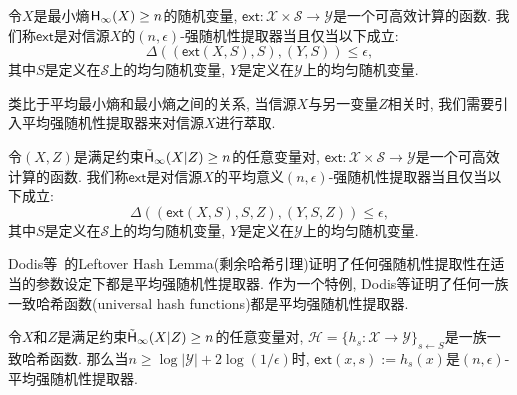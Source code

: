 \begin{definition}[强随机性提取器]
令$X$是最小熵$\mathsf{H}_\infty(X) \geq n$的随机变量,  
$\mathsf{ext}: \mathcal{X} \times \mathcal{S} \rightarrow \mathcal{Y}$是一个可高效计算的函数. 
我们称$\mathsf{ext}$是对信源$X$的$(n, \epsilon)$-强随机性提取器当且仅当以下成立:
\begin{equation*}
    \Delta((\mathsf{ext}(X, S), S), (Y, S)) \leq \epsilon,
\end{equation*} 
其中$S$是定义在$\mathcal{S}$上的均匀随机变量, $Y$是定义在$\mathcal{Y}$上的均匀随机变量. 
\end{definition}

类比于平均最小熵和最小熵之间的关系, 当信源$X$与另一变量$Z$相关时, 我们需要引入平均强随机性提取器来对信源$X$进行萃取.  
\begin{definition}[平均强随机性提取器]
令$(X, Z)$是满足约束$\tilde{\mathsf{H}}_\infty(X|Z) \geq n$的任意变量对, 
$\mathsf{ext}: \mathcal{X} \times \mathcal{S} \rightarrow \mathcal{Y}$是一个可高效计算的函数. 
我们称$\mathsf{ext}$是对信源$X$的平均意义$(n, \epsilon)$-强随机性提取器当且仅当以下成立:
\begin{equation*}
    \Delta((\mathsf{ext}(X, S), S, Z), (Y, S, Z)) \leq \epsilon,
\end{equation*} 
其中$S$是定义在$\mathcal{S}$上的均匀随机变量, $Y$是定义在$\mathcal{Y}$上的均匀随机变量. 
\end{definition}

Dodis等~\cite{DORS-SIAM-2008}的Leftover Hash Lemma(剩余哈希引理)证明了任何强随机性提取性在适当的参数设定下都是平均强随机性提取器. 
作为一个特例, Dodis等证明了任何一族一致哈希函数(universal hash functions)都是平均强随机性提取器.

\begin{lemma}\label{lemma:leftover-hash-lemma} 
令$X$和$Z$是满足约束$\tilde{\mathsf{H}}_\infty(X|Z) \geq n$的任意变量对, 
$\mathcal{H} = \{h_s: \mathcal{X} \rightarrow \mathcal{Y}\}_{s \leftarrow S}$是一族一致哈希函数. 
那么当$n \geq \log |\mathcal{Y}| + 2\log(1/\epsilon)$时, 
$\mathsf{ext}(x, s) := h_s(x)$是$(n, \epsilon)$-平均强随机性提取器.
\end{lemma}